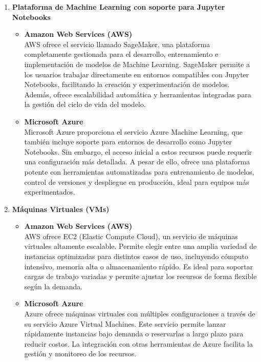 \documentclass[12pt]{article}
\begin{document}
	\begin{enumerate}[label=\arabic*.]
		\item \textbf{Plataforma de Machine Learning con soporte para Jupyter Notebooks}
		\begin{itemize}
			\item \textbf{Amazon Web Services (AWS)} \\
			AWS ofrece el servicio llamado SageMaker, una plataforma completamente gestionada para el desarrollo, entrenamiento e implementación de modelos de Machine Learning. SageMaker permite a los usuarios trabajar directamente en entornos compatibles con Jupyter Notebooks, facilitando la creación y experimentación de modelos. Además, ofrece escalabilidad automática y herramientas integradas para la gestión del ciclo de vida del modelo.
			
			\item \textbf{Microsoft Azure} \\
			Microsoft Azure proporciona el servicio Azure Machine Learning, que también incluye soporte para entornos de desarrollo como Jupyter Notebooks. Sin embargo, el acceso inicial a estos recursos puede requerir una configuración más detallada. A pesar de ello, ofrece una plataforma potente con herramientas automatizadas para entrenamiento de modelos, control de versiones y despliegue en producción, ideal para equipos más experimentados.
		\end{itemize}
		
		\item \textbf{Máquinas Virtuales (VMs)}
		\begin{itemize}
			\item \textbf{Amazon Web Services (AWS)} \\
			AWS ofrece EC2 (Elastic Compute Cloud), un servicio de máquinas virtuales altamente escalable. Permite elegir entre una amplia variedad de instancias optimizadas para distintos casos de uso, incluyendo cómputo intensivo, memoria alta o almacenamiento rápido. Es ideal para soportar cargas de trabajo variadas y permite ajustar los recursos de forma flexible según la demanda.
			
			\item \textbf{Microsoft Azure} \\
			Azure ofrece máquinas virtuales con múltiples configuraciones a través de su servicio Azure Virtual Machines. Este servicio permite lanzar rápidamente instancias bajo demanda o reservarlas a largo plazo para reducir costos. La integración con otras herramientas de Azure facilita la gestión y monitoreo de los recursos.
		\end{itemize}
		

\end{enumerate}
\end{document}
